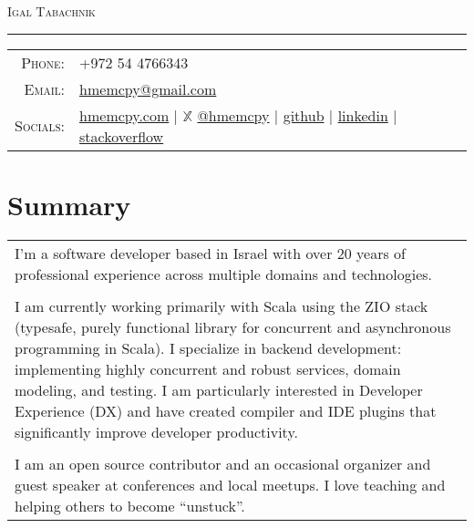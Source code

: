 \documentclass[a4paper,11pt]{article}
\begin{document}
\par{\centering
		{\Huge \textsc{Igal Tabachnik}
	}\bigskip\par}

\hrule
\vspace{0.5em}
\begin{tabular}{rl}
  \textsc{Phone:}     & +972 54 4766343\\
  \textsc{Email:}     & \href{mailto:hmemcpy@gmail.com}{hmemcpy@gmail.com}\\
  \textsc{Socials:}   & \faHome{} \href{https://hmemcpy.com}{hmemcpy.com} 
                      | $\mathbb{X}$ \href{https://twitter.com/hmemcpy}{@hmemcpy}
                      | \faGithub{} \href{https://github.com/hmemcpy}{github}
                      | \faLinkedin{} \href{https://www.linkedin.com/in/igaltabachnik/}{linkedin}
                      | \faStackOverflow{} \href{https://stackoverflow.com/users/8205/igal-tabachnik}{stackoverflow}
\end{tabular}

\section{Summary}
\begin{tabular}{p{}}
  I'm a software developer based in Israel with over 20 years of professional experience across multiple domains and technologies.\\\\

  I am currently working primarily with Scala using the ZIO stack (typesafe, purely functional library for concurrent and asynchronous programming in Scala). I specialize in backend development: implementing highly concurrent and robust services, domain modeling, and testing. I am particularly interested in Developer Experience (DX) and have created compiler and IDE plugins that significantly improve developer productivity.\\\\

  I am an open source contributor and an occasional organizer and guest speaker at conferences and local meetups. I love teaching and helping others to become ``unstuck''.
\end{tabular}
\end{document}
